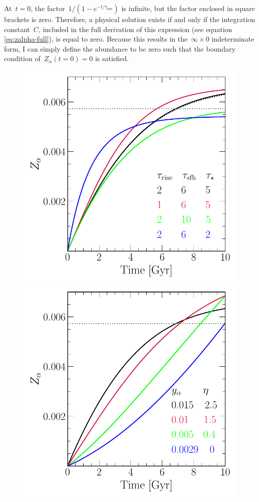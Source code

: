 \documentclass[12pt]{article}
\newcommand{\timescale}[1]{\ensuremath{\tau_\text{#1}}}
\begin{document}
\par
At~$t = 0$, the factor~$1 / (1 - e^{-t / \timescale{rise}})$ is infinite,
but the factor enclosed in square brackets is zero.
Therefore, a physical solution exists if and only if the integration
constant~$C$, included in the full derivation of this expression (see equation
\ref{eq:zalpha-full}), is equal to zero.
Because this results in the~$\infty \times 0$ indeterminate form, I can simply
define the abundance to be zero such that the boundary condition
of~$Z_\alpha(t = 0) = 0$ is satisfied.

\begin{figure}
\centering
\includegraphics[scale = 0.52]{vartimescales.pdf}
\includegraphics[scale = 0.52]{varyieldeta.pdf}

\end{figure}
\end{document}
